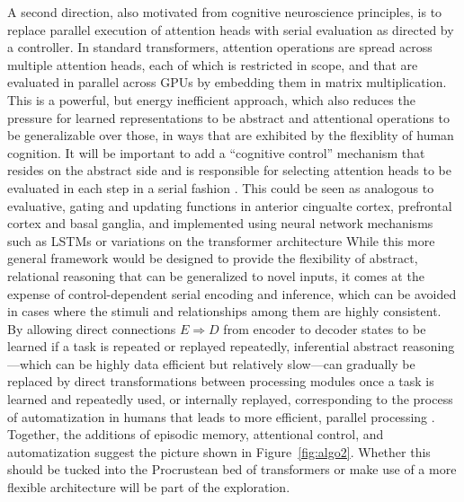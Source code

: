 A second direction, also motivated from cognitive neuroscience principles, is to replace 
parallel execution of attention heads with serial evaluation as directed by a controller. 
In standard transformers, attention operations are spread across multiple attention heads,
each of which is restricted in scope, and that are evaluated in parallel across GPUs by embedding them in matrix
multiplication. This is a powerful, but energy inefficient approach, which also reduces the pressure for learned
representations to be abstract and attentional operations to be generalizable over those, in ways that are exhibited
by the flexiblity of human cognition.  It will be important to add a ``cognitive control'' mechanism that resides on
the abstract side and is responsible for selecting attention heads to be evaluated in each step in a serial fashion \citep{cohen2017cognitive}.  This could be seen as analogous to evaluative, gating and updating functions in anterior cingualte cortex, prefrontal cortex and basal ganglia,
and implemented using neural network mechanisms such as LSTMs \citep{lstm} or variations on the transformer
architecture
While this more general framework would be designed to provide the flexibility of abstract, relational reasoning that
can be generalized to novel inputs, it comes at the expense of control-dependent serial encoding and inference, which can be avoided in cases where the stimuli and relationships among them are highly consistent. By allowing
direct connections $E \Rightarrow D$ from encoder to decoder states to be learned if a task is repeated or replayed
repeatedly, inferential abstract reasoning---which can be highly data efficient but relatively slow---can gradually
be replaced by direct transformations between processing modules once a task is learned and repeatedly used, or
internally replayed, corresponding to the process of automatization in humans that leads to more efficient, parallel
processing \citep{schneider1977controlled, ravi2020navigating, musslick2021rationalizing}.  Together, the additions of
episodic memory, attentional control, and automatization suggest the picture shown in Figure~\ref{fig:algo2}. Whether
this should be tucked into the Procrustean bed of transformers or make use of a more flexible architecture will be part of the exploration.



